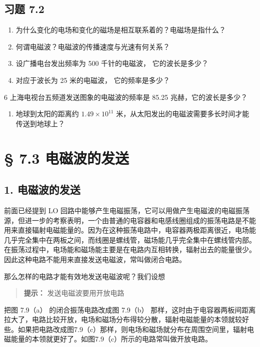 \subsection{习题 7.2}\label{ux4e60ux9898-7.2}

\begin{enumerate}
\def\labelenumi{\arabic{enumi}.}
\item
  为什么变化的电场和变化的磁场是相互联系着的？电磁场是指什么？
\item
  何谓电磁波？电磁波的传播速度与光速有何关系？
\item
  设广播电台发出频率为 500 千针的电磁波， 它的波长是多少？
\item
  对应于波长为 25 米的电磁波， 它的频率是多少？
\end{enumerate}

6 上海电视台五频道发送图象的电磁波的频率是 85.25 兆赫，它的波长是多少？

\begin{enumerate}
\def\labelenumi{\arabic{enumi}.}
\setcounter{enumi}{5}
\tightlist
\item
  地球到太阳的距离约 \(1.49 \times 10^{11}\)
  米，从太阳发出的电磁波需要多长时间才能传送到地球上？
\end{enumerate}

\section{§ 7.3 电磁波的发送}\label{ux7535ux78c1ux6ce2ux7684ux53d1ux9001}

\subsection{1.
电磁波的发送}\label{ux7535ux78c1ux6ce2ux7684ux53d1ux9001-1}

前面已经提到 LO
回路中能够产生电磁振荡，它可以用做产生电磁波的电磁振荡源，但进一步的考察表明，一个由普通的电容器和电感线圈组成的振荡电路是不能用来直接辐射电磁能量的。因为在这种振荡电路中，电容器两极距离很近，电场能几乎完全集中在两板之间，而线圈是螺线管，磁场能几乎完全集中在螺线管内部。在振荡过程中，电场能和磁场能主要是在电路内互相转换，辐射出去的能量很少。因此这种电路不能用来直接发送电磁波，常叫做闭合电路。

那么怎样的电路才能有效地发送电磁波呢？我们设想

\begin{quote}
\textbf{提示：} 发送电磁波要用开放电路
\end{quote}

把图 7.9（a） 的闭合振荡电路改成图 7.9（b）
那样，这时由于电容器两板间距离拉大了，电路比较开放，电场和磁场分布得较分散，辐射电磁能量的本领就较好些。如果把电路改成图7.9（c）那样，则电场和磁场就分布在周围空间里，辐射电磁能量的本领就更好了。如图7.9（c）所示的电路常叫做开放电路。

